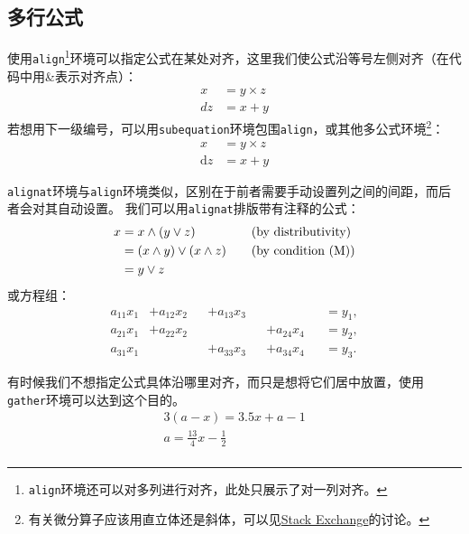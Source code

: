 \documentclass[zihao = -4, linespread = 1.5]{ctexart} %
\begin{document}
\subsection{多行公式}\label{subsec:multiEqn}
使用\texttt{align}\footnote{\texttt{align}环境还可以对多列进行对齐，此处只展示了对一列对齐。}环境可以指定公式在某处对齐，这里我们使公式沿等号左侧对齐（在代码中用\&表示对齐点）：
\begin{align}\label{eq:align}
  x &= y \times z  \\
  dz &= x + y
\end{align}
若想用下一级编号，可以用\texttt{subequation}环境包围\texttt{align}，或其他多公式环境\footnote{有关微分算子应该用直立体还是斜体，可以见\href{https://tex.stackexchange.com/questions/14821/whats-the-proper-way-to-typeset-a-differential-operator}{Stack Exchange}的讨论。}：
\begin{subequations}\label{eq:subEqn}
  \begin{align}
  x &= y \times z  \\
  \mathrm{d}z &= x + y
\end{align}
\end{subequations}

\texttt{alignat}环境与\texttt{align}环境类似，区别在于前者需要手动设置列之间的间距，而后者会对其自动设置。
我们可以用\texttt{alignat}排版带有注释的公式：
\begin{alignat}{2}
    x &= x \wedge (y \vee z) &
    &\quad\text{(by distributivity)}\\
        &= (x \wedge y) \vee (x \wedge z) & &
            \quad\text{(by condition (M))}\notag\\
        &= y \vee z \notag
\end{alignat}
或方程组：
\begin{subequations}
\begin{alignat}{4}
a_{11}x_1 &+ a_{12}x_2 &&+ a_{13}x_3  &&                   &&= y_1,\\
a_{21}x_1 &+ a_{22}x_2 &&                    &&+ a_{24}x_4 &&= y_2,\\
a_{31}x_1 &                   &&+ a_{33}x_3  &&+ a_{34}x_4 &&= y_3.
\end{alignat}
\end{subequations}


有时候我们不想指定公式具体沿哪里对齐，而只是想将它们居中放置，使用\texttt{gather}环境可以达到这个目的。
\begin{gather}
    3(a-x) = 3.5x + a - 1 \\
    a = \frac{13}{4}x - \frac{1}{2} \\
\end{gather}
\end{document}

